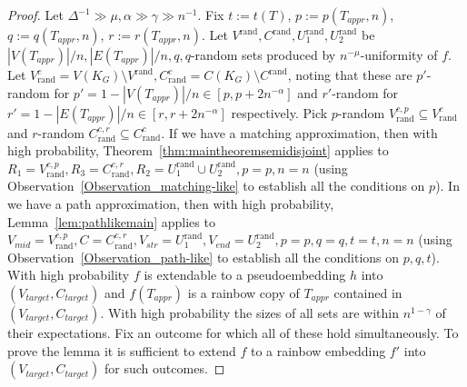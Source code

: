 \documentclass[a4paper,11pt,hidelinks]{amsart}
\theoremstyle{definition}
\begin{document}
\begin{proof}
Let $\Delta^{-1}\gg \mu,\alpha\gg \gamma\gg n^{-1}$. Fix $t:=t(T)$, $p:=p(T_{appr},n)$, $q:=q(T_{appr},n)$, $r:=r(T_{appr},n)$.
Let $V^{\mathrm{rand}}, C^{\mathrm{rand}}, U_1^{\mathrm{rand}}, U_2^{\mathrm{rand}}$ be $|V(T_{appr})|/n,|E(T_{appr})|/n,q,q$-random sets produced by $n^{-\mu}$-uniformity of $f$.  Let $V^c_{\mathrm{rand}}=V(K_G)\setminus V^{\mathrm{rand}}, C^c_{\mathrm{rand}}=C(K_G)\setminus C^{\mathrm{rand}}$, noting that these are $p'$-random for $p'=1-|V(T_{appr})|/n\in [p, p+2n^{-\alpha}]$ and $r'$-random for $r'=1-|E({T_{appr}})|/n\in [r, r+2n^{-\alpha}]$ respectively. Pick $p$-random $V^{c,p}_{\mathrm{rand}}\subseteq V^c_{\mathrm{rand}}$ and $r$-random $C^{c,r}_{\mathrm{rand}}\subseteq C^c_{\mathrm{rand}}$.
If we have a matching approximation, then with high probability, Theorem~\ref{thm:maintheoremsemidisjoint} applies to $R_1=V^{c,p}_{\mathrm{rand}}, R_3=C^{c,r}_{\mathrm{rand}}, R_2=U_1^{\mathrm{rand}}\cup U_2^{\mathrm{rand}}, p=p, n=n$ (using Observation~\ref{Observation_matching-like} to establish all the conditions on $p$). In we have a path approximation, then with high probability, Lemma~\ref{lem:pathlikemain} applies to $V_{mid}=V^{c,p}_{\mathrm{rand}}, C=C^{c,r}_{\mathrm{rand}}, V_{str}=U_1^{\mathrm{rand}}, V_{end}=U_2^{\mathrm{rand}}, p=p,q=q, t=t, n=n$ (using Observation~\ref{Observation_path-like} to establish all the conditions on $p,q,t$).  With high probability $f$ is extendable to a pseudoembedding $h$ into $(V_{target}, C_{target})$ and $f(T_{appr})$ is a rainbow copy of $T_{appr}$ contained in $(V_{target},  C_{target})$. With high probability the sizes of all sets are within $n^{1-\gamma}$ of their expectations.
Fix an outcome for which all of these hold simultaneously. To prove the lemma it is sufficient to extend $f$ to a rainbow embedding $f'$ into $(V_{target}, C_{target})$ for such outcomes. 


\end{proof}
\end{document}
